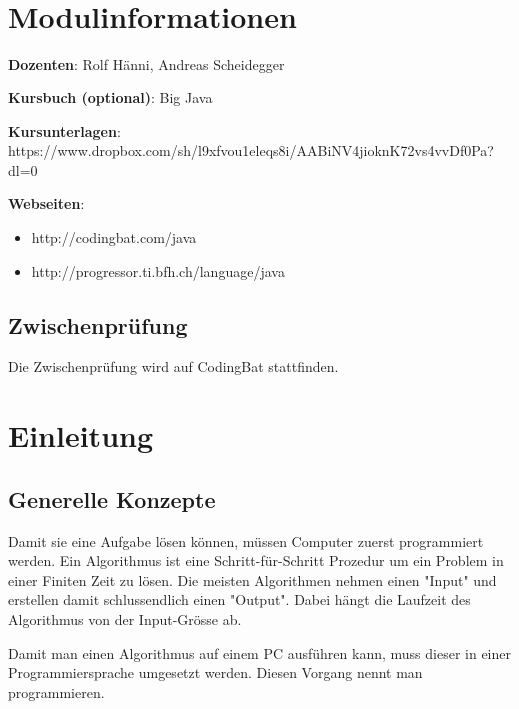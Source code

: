 \documentclass[12pt, a4paper, oneside]{article}
\title{\vspace{-1.5cm}\subjectIdentifier{}\\\subject{}\\\lectionWeek{}}
\author{\vspace{-1.5cm}}
\date{\vspace{-1.5cm}}
\begin{document}
\maketitle
\thispagestyle{fancy}

\section{Modulinformationen}
{\bf Dozenten}: Rolf Hänni, Andreas Scheidegger

{\bf Kursbuch (optional)}: Big Java

{\bf Kursunterlagen}: \\ https://www.dropbox.com/sh/l9xfvou1eleqs8i/AABiNV4jioknK72vs4vvDf0Pa?dl=0

{\bf Webseiten}:
\begin{itemize}
    \item http://codingbat.com/java
    \item http://progressor.ti.bfh.ch/language/java
\end{itemize}
\subsection{Zwischenprüfung}
Die Zwischenprüfung wird auf CodingBat stattfinden.

\section{Einleitung}
\subsection{Generelle Konzepte}
Damit sie eine Aufgabe lösen können, müssen Computer zuerst programmiert werden.
Ein Algorithmus ist eine Schritt-für-Schritt Prozedur um ein Problem in einer Finiten Zeit zu lösen. Die meisten Algorithmen nehmen einen "Input" und erstellen damit schlussendlich einen "Output". Dabei hängt die Laufzeit des Algorithmus von der Input-Grösse ab.

Damit man einen Algorithmus auf einem PC ausführen kann, muss dieser in einer Programmiersprache umgesetzt werden. Diesen Vorgang nennt man programmieren.
\end{document}
